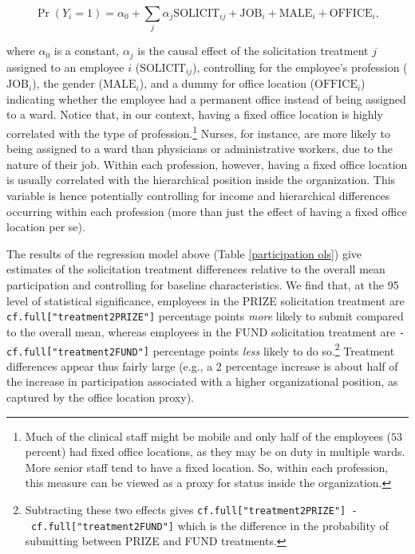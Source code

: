 \documentclass[11pt, titlepage]{article}
\begin{document}
\[\Pr(Y_i=1) = \alpha_0 
                                    + \sum_{j} \alpha_{j} \text{SOLICIT}_{ij}
                                    + \text{JOB}_{i} 
                                    + \text{MALE}_{i} 
                                    + \text{OFFICE}_{i},\label{submit}\]

where \(\alpha_0\) is a constant, \(\alpha_j\) is the causal effect of
the solicitation treatment \(j\) assigned to an employee \(i\)
(\(\text{SOLICIT}_{ij}\)), controlling for the employee's profession
(\(\text{JOB}_i\)), the gender (\(\text{MALE}_i\)), and a dummy for
office location (\(\text{OFFICE}_i\)) indicating whether the employee
had a permanent office instead of being assigned to a ward. Notice that,
in our context, having a fixed office location is highly correlated with
the type of profession.\footnote{Much of the clinical staff might be
  mobile and only half of the employees (\(53\) percent) had fixed
  office locations, as they may be on duty in multiple wards. More
  senior staff tend to have a fixed location. So, within each
  profession, this measure can be viewed as a proxy for status inside
  the organization.} Nurses, for instance, are more likely to being
assigned to a ward than physicians or administrative workers, due to the
nature of their job. Within each profession, however, having a fixed
office location is usually correlated with the hierarchical position
inside the organization. This variable is hence potentially controlling
for income and hierarchical differences occurring within each profession
(more than just the effect of having a fixed office location per se).



The results of the regression model above (Table
\ref{participation ols}) give estimates of the solicitation treatment
differences relative to the overall mean participation and controlling
for baseline characteristics. We find that, at the 95 level of
statistical significance, employees in the PRIZE solicitation treatment
are \texttt{cf.full{[}"treatment2PRIZE"{]}} percentage points
\emph{more} likely to submit compared to the overall mean, whereas
employees in the FUND solicitation treatment are
\texttt{-cf.full{[}"treatment2FUND"{]}} percentage points \emph{less}
likely to do so.\footnote{Subtracting these two effects gives
  \texttt{cf.full{[}"treatment2PRIZE"{]}\ -\ cf.full{[}"treatment2FUND"{]}}
  which is the difference in the probability of submitting between PRIZE
  and FUND treatments.} Treatment differences appear thus fairly large
(e.g., a 2 percentage increase is about half of the increase in
participation associated with a higher organizational position, as
captured by the office location proxy).
\end{document}

